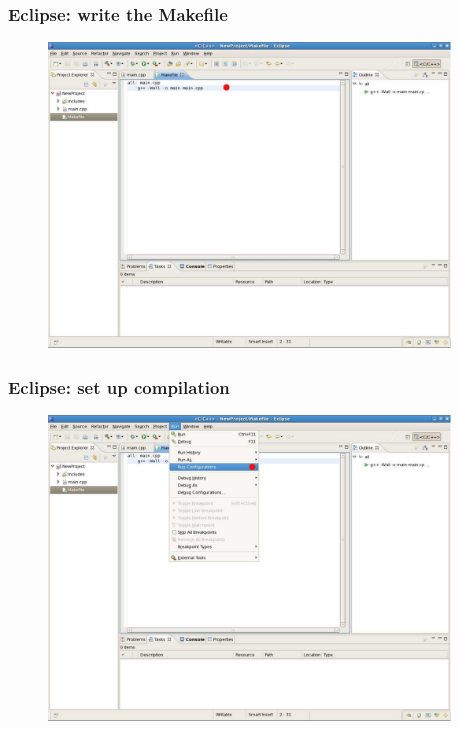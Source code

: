 \documentclass{beamer}
\begin{document}

\begin{frame}[fragile]

    \frametitle{Eclipse: write the Makefile}

    \begin{figure}
        \centering
        \includegraphics[width=0.95\textwidth]{./images/eclipse8}
    \end{figure}

\end{frame}


\begin{frame}[fragile]

    \frametitle{Eclipse: set up compilation}

    \begin{figure}
        \centering
        \includegraphics[width=0.95\textwidth]{./images/eclipse9}
    \end{figure}

\end{frame}
\end{document}
